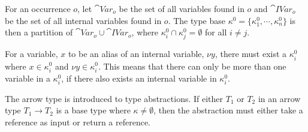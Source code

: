 \documentclass{eptcs}
\begin{document}
\begin{definition}
	For an occurrence $o$, let $\cat{Var}_o$ be the set of all
        variables found in $o$ and $\cat{IVar}_o$ be the set of all
        internal variables found in $o$.
	The type base $\kappa^0=\{\kappa^0_1,\cdots,\kappa^0_n\}$ is
        then a partition of $\cat{Var}_o \cup \cat{IVar}_o$, where
        $\kappa_i^0\cap\kappa_j^0=\emptyset$ for all $i\neq j$. 
\end{definition}
For a variable, $x$ to be an alias of an internal variable, $\nu y$,
there must exist a $\kappa^0_i$ where $x \in \kappa^0_i$ and $\nu y
\in \kappa^0_i$. This means that there can only be more than one
variable in a $\kappa^0_i$, if there also exists an internal variable
in $\kappa^0_i$.


The arrow type is introduced to type abstractions.
If either $T_1$ or $T_2$ in an arrow type $T_1 \to T_2$ is a base type where $\kappa \neq \emptyset$,
then the abstraction must either take a reference as input or return a reference.


\end{document}

